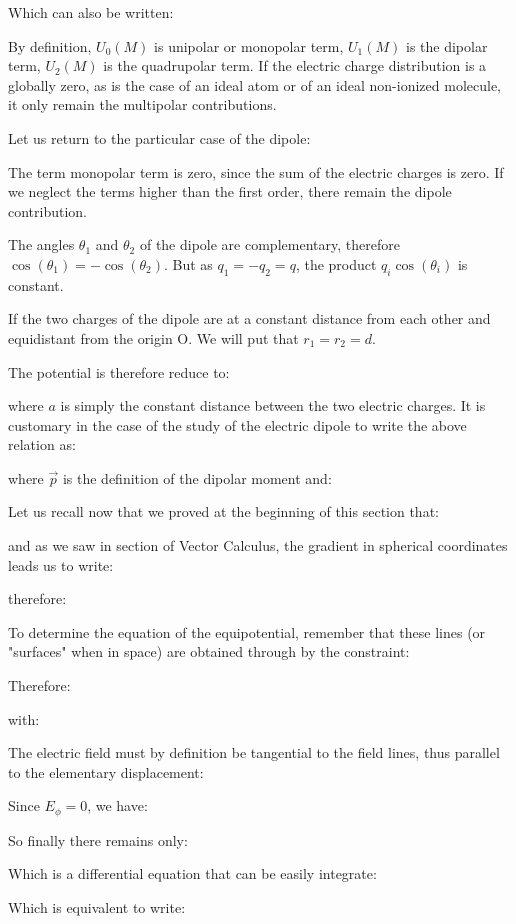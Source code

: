 	Which can also be written:
	
	By definition, $U_0(M)$ is unipolar or monopolar term, $U_1(M)$ is the dipolar term, $U_2(M)$ is the quadrupolar term. If the electric charge distribution is a globally zero, as is the case of an ideal atom or of an ideal non-ionized molecule, it only remain the multipolar contributions.
	
	Let us return to the particular case of the dipole:
	
	The term monopolar term is zero, since the sum of the electric charges is zero. If we neglect the terms higher than the first order, there remain the dipole contribution.
	
	The angles $\theta_1$ and $\theta_2$ of the dipole are complementary, therefore $\cos(\theta_1)=-\cos(\theta_2)$. But as $q_1=-q_2=q$, the product $q_i\cos(\theta_i)$ is constant.
	
	If the two charges of the dipole are at a constant distance from each other and equidistant from the origin O. We will put that $r_1=r_2=d$.

	The potential is therefore reduce to:
	
	
	where $a$ is simply the constant distance between the two electric charges.
	It is customary in the case of the study of the electric dipole to write the above relation as:
	
	where $\vec{p}$ is the definition of the dipolar moment and:
	
	Let us recall now that we proved at the beginning of this section that:
	
	and as we saw in section of Vector Calculus, the gradient in spherical coordinates leads us to write:
	
	therefore:
	
	To determine the equation of the equipotential, remember that these lines (or "surfaces" when in space) are obtained through by the constraint:
	
	Therefore:
	
	with:
	
	The electric field must by definition be tangential to the field lines, thus parallel to the elementary displacement:
	
	Since $E_\phi=0$, we have:
	
	So finally there remains only:
	
	Which is a differential equation that can be easily integrate:
	
	Which is equivalent to write:
	

